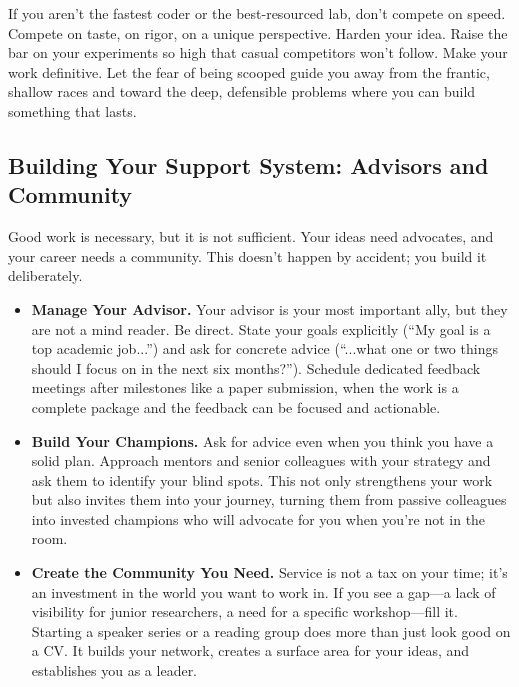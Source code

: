 If you aren't the fastest coder or the best-resourced lab, don't compete on speed.
Compete on taste, on rigor, on a unique perspective.
Harden your idea.
Raise the bar on your experiments so high that casual competitors won't follow.
Make your work definitive.
Let the fear of being scooped guide you away from the frantic, shallow races and toward the deep, defensible problems where you can build something that lasts.

\subsection{Building Your Support System: Advisors and Community}

Good work is necessary, but it is not sufficient.
Your ideas need advocates, and your career needs a community.
This doesn't happen by accident; you build it deliberately.

\begin{itemize}[leftmargin=*]
    \item \textbf{Manage Your Advisor.} Your advisor is your most important ally, but they are not a mind reader.
    Be direct.
    State your goals explicitly (``My goal is a top academic job...'') and ask for concrete advice (``...what one or two things should I focus on in the next six months?'').
    Schedule dedicated feedback meetings after milestones like a paper submission, when the work is a complete package and the feedback can be focused and actionable.
    \item \textbf{Build Your Champions.} Ask for advice even when you think you have a solid plan.
    Approach mentors and senior colleagues with your strategy and ask them to identify your blind spots.
    This not only strengthens your work but also invites them into your journey, turning them from passive colleagues into invested champions who will advocate for you when you're not in the room.
    \item \textbf{Create the Community You Need.} Service is not a tax on your time; it's an investment in the world you want to work in.
    If you see a gap---a lack of visibility for junior researchers, a need for a specific workshop---fill it.
    Starting a speaker series or a reading group does more than just look good on a CV.
    It builds your network, creates a surface area for your ideas, and establishes you as a leader.
\end{itemize}
